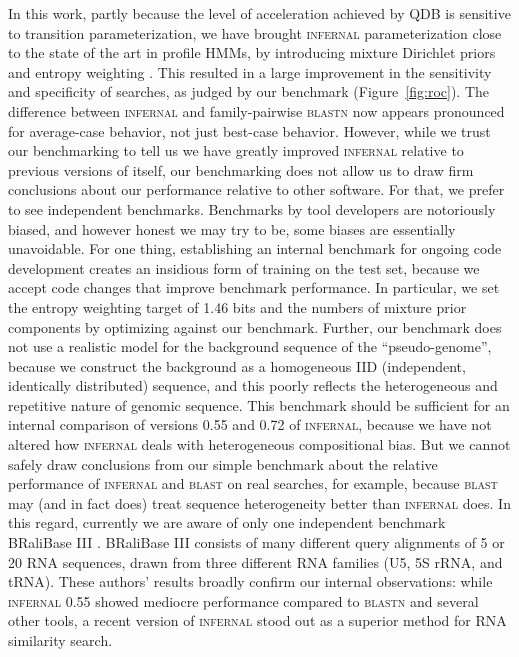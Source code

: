 \documentclass[11pt]{article}
\begin{document}
In this work, partly because the level of acceleration achieved by QDB
is sensitive to transition parameterization, we have brought
\textsc{infernal} parameterization close to the state of the art in
profile HMMs, by introducing mixture Dirichlet priors
\cite{Sjolander96} and entropy weighting \cite{Karplus98}. This
resulted in a large improvement in the sensitivity and specificity of
searches, as judged by our benchmark (Figure~\ref{fig:roc}). The
difference between \textsc{infernal} and family-pairwise
\textsc{blastn} now appears pronounced for average-case behavior, not
just best-case behavior. However, while we trust our benchmarking to
tell us we have greatly improved \textsc{infernal} relative to
previous versions of itself, our benchmarking does not allow us to
draw firm conclusions about our performance relative to other
software. For that, we prefer to see independent
benchmarks. Benchmarks by tool developers are notoriously biased, and
however honest we may try to be, some biases are essentially
unavoidable. For one thing, establishing an internal benchmark for
ongoing code development creates an insidious form of training on the
test set, because we accept code changes that improve benchmark
performance.  In particular, we set the entropy weighting target of
1.46 bits and the numbers of mixture prior components by optimizing
against our benchmark.  Further, our benchmark does not use a
realistic model for the background sequence of the ``pseudo-genome'',
because we construct the background as a homogeneous IID (independent,
identically distributed) sequence, and this poorly reflects the
heterogeneous and repetitive nature of genomic sequence.  This
benchmark should be sufficient for an internal comparison of versions
0.55 and 0.72 of \textsc{infernal}, because we have not altered how
\textsc{infernal} deals with heterogeneous compositional bias. But we
cannot safely draw conclusions from our simple benchmark about the
relative performance of \textsc{infernal} and \textsc{blast} on real
searches, for example, because \textsc{blast} may (and in fact does)
treat sequence heterogeneity better than \textsc{infernal} does.  In
this regard, currently we are aware of only one independent benchmark
BRaliBase III \cite{Freyhult07}. BRaliBase III consists of many
different query alignments of 5 or 20 RNA sequences, drawn from three
different RNA families (U5, 5S rRNA, and tRNA). These authors' results
broadly confirm our internal observations: while \textsc{infernal}
0.55 showed mediocre performance compared to \textsc{blastn} and
several other tools, a recent version of \textsc{infernal} stood out
as a superior method for RNA similarity search.
\end{document}
